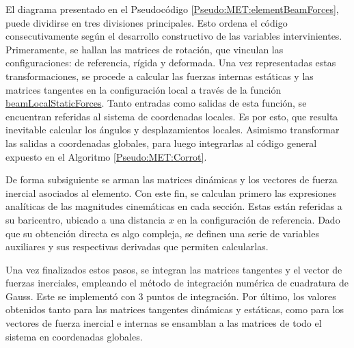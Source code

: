 El diagrama presentado en el Pseudocódigo \ref{Pseudo:MET:elementBeamForces}, puede dividirse en tres divisiones principales. Esto ordena el código consecutivamente según el desarrollo constructivo de las variables intervinientes. Primeramente, se hallan las matrices de rotación, que vinculan las configuraciones: de referencia, rígida y deformada. Una vez representadas estas transformaciones, se procede a calcular las fuerzas internas estáticas y las matrices tangentes en la configuración local a través de la función \href{https://github.com/ONSAS/ONSAS/blob/master/src/beamLocalStaticForces.m}{beamLocalStaticForces}. Tanto entradas como salidas de esta función, se encuentran referidas al sistema de coordenadas locales. Es por esto, que resulta inevitable calcular los ángulos y desplazamientos locales. Asimismo transformar las salidas a coordenadas globales, para luego integrarlas al código general expuesto en el Algoritmo  \ref{Pseudo:MET:Corrot}.

De forma subsiguiente se arman las matrices dinámicas y los vectores de fuerza inercial asociados al elemento. Con este fin, se calculan primero las expresiones analíticas de las magnitudes cinemáticas en cada sección. Estas están referidas a su baricentro, ubicado a una distancia $x$ en la configuración de referencia. Dado que su obtención directa es algo compleja, se definen una serie de variables auxiliares y sus respectivas derivadas que permiten calcularlas.  

Una vez finalizados estos pasos, se integran las matrices tangentes y el vector de fuerzas inerciales, empleando el método de integración numérica de cuadratura de Gauss. Este se implementó con 3 puntos de integración. Por último, los valores obtenidos tanto para las matrices tangentes dinámicas y estáticas, como para los vectores de fuerza inercial e internas se ensamblan a las matrices de todo el sistema en coordenadas globales.

